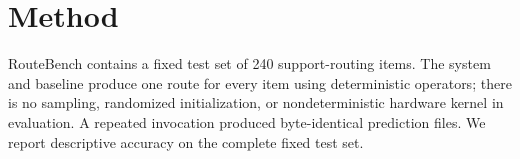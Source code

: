 \section{Method}

RouteBench contains a fixed test set of 240 support-routing items. The system
and baseline produce one route for every item using deterministic operators;
there is no sampling, randomized initialization, or nondeterministic hardware
kernel in evaluation. A repeated invocation produced byte-identical prediction
files. We report descriptive accuracy on the complete fixed test set.

